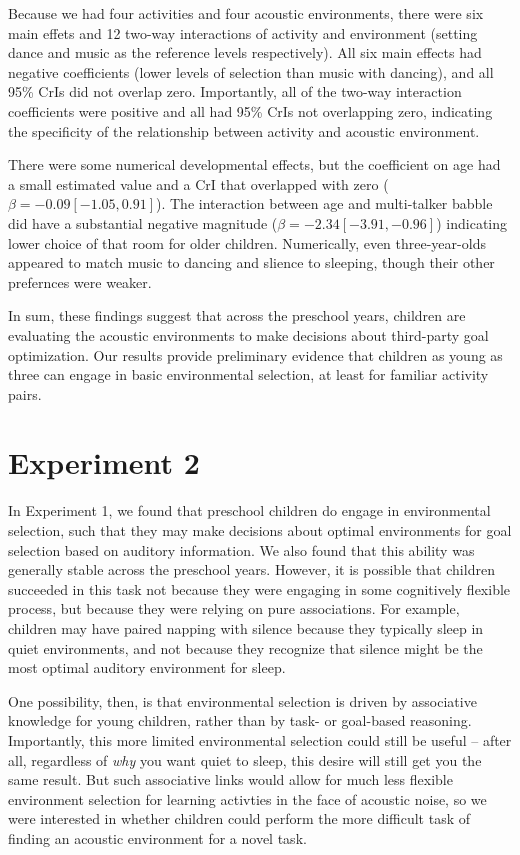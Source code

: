 \documentclass[10pt, letterpaper]{article}
\begin{document}
Because we had four activities and four acoustic environments, there
were six main effets and 12 two-way interactions of activity and
environment (setting dance and music as the reference levels
respectively). All six main effects had negative coefficients (lower
levels of selection than music with dancing), and all 95\% CrIs did not
overlap zero. Importantly, all of the two-way interaction coefficients
were positive and all had 95\% CrIs not overlapping zero, indicating the
specificity of the relationship between activity and acoustic
environment.

There were some numerical developmental effects, but the coefficient on
age had a small estimated value and a CrI that overlapped with zero
(\(\beta = -0.09 [-1.05, 0.91]\)). The interaction between age and
multi-talker babble did have a substantial negative magnitude
(\(\beta = -2.34 [-3.91,-0.96]\)) indicating lower choice of that room
for older children. Numerically, even three-year-olds appeared to match
music to dancing and slience to sleeping, though their other prefernces
were weaker.

In sum, these findings suggest that across the preschool years, children
are evaluating the acoustic environments to make decisions about
third-party goal optimization. Our results provide preliminary evidence
that children as young as three can engage in basic environmental
selection, at least for familiar activity pairs.

\hypertarget{experiment-2}{%
\section{Experiment 2}\label{experiment-2}}

In Experiment 1, we found that preschool children do engage in
environmental selection, such that they may make decisions about optimal
environments for goal selection based on auditory information. We also
found that this ability was generally stable across the preschool years.
However, it is possible that children succeeded in this task not because
they were engaging in some cognitively flexible process, but because
they were relying on pure associations. For example, children may have
paired napping with silence because they typically sleep in quiet
environments, and not because they recognize that silence might be the
most optimal auditory environment for sleep.

One possibility, then, is that environmental selection is driven by
associative knowledge for young children, rather than by task- or
goal-based reasoning. Importantly, this more limited environmental
selection could still be useful -- after all, regardless of \emph{why}
you want quiet to sleep, this desire will still get you the same result.
But such associative links would allow for much less flexible
environment selection for learning activties in the face of acoustic
noise, so we were interested in whether children could perform the more
difficult task of finding an acoustic environment for a novel task.
\end{document}
